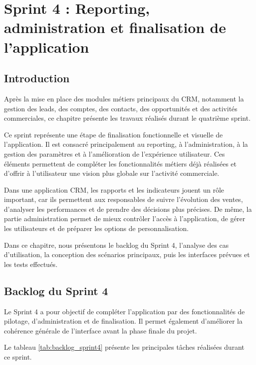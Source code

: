 \documentclass[12pt,a4paper]{report}
\begin{document}
\chapter{Sprint 4 : Reporting, administration et finalisation de l’application}

\section*{Introduction}

Après la mise en place des modules métiers principaux du CRM, notamment la gestion des leads, des comptes, des contacts, des opportunités et des activités commerciales, ce chapitre présente les travaux réalisés durant le quatrième sprint.

Ce sprint représente une étape de finalisation fonctionnelle et visuelle de l’application. Il est consacré principalement au reporting, à l’administration, à la gestion des paramètres et à l’amélioration de l’expérience utilisateur. Ces éléments permettent de compléter les fonctionnalités métiers déjà réalisées et d’offrir à l’utilisateur une vision plus globale sur l’activité commerciale.

Dans une application CRM, les rapports et les indicateurs jouent un rôle important, car ils permettent aux responsables de suivre l’évolution des ventes, d’analyser les performances et de prendre des décisions plus précises. De même, la partie administration permet de mieux contrôler l’accès à l’application, de gérer les utilisateurs et de préparer les options de personnalisation.

Dans ce chapitre, nous présentons le backlog du Sprint 4, l’analyse des cas d’utilisation, la conception des scénarios principaux, puis les interfaces prévues et les tests effectués.

\section{Backlog du Sprint 4}

Le Sprint 4 a pour objectif de compléter l’application par des fonctionnalités de pilotage, d’administration et de finalisation. Il permet également d’améliorer la cohérence générale de l’interface avant la phase finale du projet.

Le tableau \ref{tab:backlog_sprint4} présente les principales tâches réalisées durant ce sprint.
\end{document}
